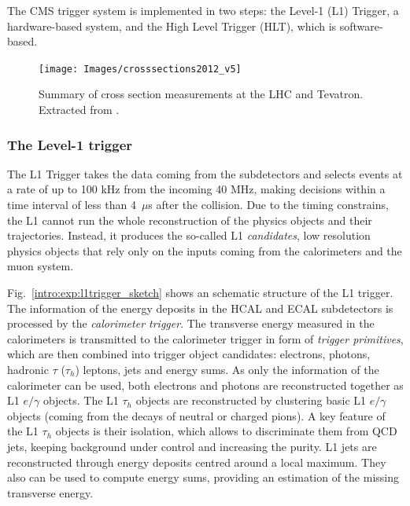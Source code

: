\documentclass[../main.tex]{subfiles}
\begin{document}
The CMS trigger system \cite{intro:exp:cms_trigger} is implemented in two steps: the Level-1 (L1) Trigger, a hardware-based system, and the High Level Trigger (HLT), which is software-based.

\begin{figure}[h!]
\begin{center}
\texttt{[image: Images/crosssections2012\_v5]}
\end{center}
\caption{Summary of cross section measurements at the LHC and Tevatron. Extracted from \cite{intro:exp:xs}.}
\label{intro:exp:xs}
\end{figure}


\subsubsection{The Level-1 trigger}

The L1 Trigger takes the data coming from the subdetectors and selects events at a rate of up to 100 kHz from the incoming 40 MHz, making decisions within a time interval of less than 4~$\mu$s after the collision. Due to the timing constrains, the L1 cannot run the whole reconstruction of the physics objects and their trajectories. Instead, it produces the so-called L1 \textit{candidates}, low resolution physics objects that rely only on the inputs coming from the calorimeters and the muon system.


Fig.~\ref{intro:exp:l1trigger_sketch} shows an schematic structure of the L1 trigger. The information of the energy deposits in the HCAL and ECAL subdetectors is processed by the \textit{calorimeter trigger}. The transverse energy measured in the calorimeters is transmitted to the calorimeter trigger in form of \textit{trigger primitives}, which are then combined into trigger object candidates: electrons, photons, hadronic $\tau$ ($\tau_h$) leptons, jets and energy sums. As only the information of the calorimeter can be used, both electrons and photons are reconstructed together as L1 $e/\gamma$ objects. The L1 $\tau_h$ objects are reconstructed by clustering basic L1 $e/\gamma$ objects (coming from the decays of neutral or charged pions). A key feature of the L1 $\tau_h$ objects is their isolation, which allows to discriminate them from QCD jets, keeping background under control and increasing the purity. L1 jets are reconstructed through energy deposits centred around a local maximum. They also can be used to compute energy sums, providing an estimation of the missing transverse energy.
 
\end{document}

